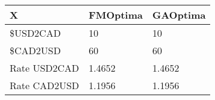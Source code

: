 \begin{tabular}{lll}
X & FMOptima & GAOptima \\ 
\hline 
\$USD2CAD & 10 & 10 \\ 
\$CAD2USD & 60 & 60 \\ 
Rate USD2CAD & 1.4652 & 1.4652 \\ 
Rate CAD2USD & 1.1956 & 1.1956 \\ 
\hline 
\end{tabular}